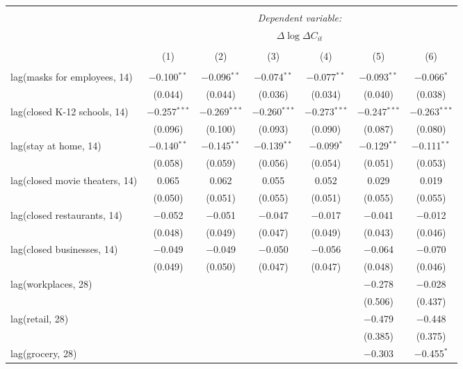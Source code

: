 \begin{tabular}{@{\extracolsep{1pt}}lcccccc} 
\\[-1.8ex]\hline 
\hline \\[-1.8ex] 
 & \multicolumn{6}{c}{\textit{Dependent variable:}} \\ 
\cline{2-7} 
 & \multicolumn{6}{c}{$\Delta \log \Delta C_{it}$} \\ 
\\[-1.8ex] & (1) & (2) & (3) & (4) & (5) & (6)\\ 
\hline \\[-1.8ex] 
 lag(masks for employees, 14) & $-$0.100$^{**}$ & $-$0.096$^{**}$ & $-$0.074$^{**}$ & $-$0.077$^{**}$ & $-$0.093$^{**}$ & $-$0.066$^{*}$ \\ 
  & (0.044) & (0.044) & (0.036) & (0.034) & (0.040) & (0.038) \\ 
  lag(closed K-12 schools, 14) & $-$0.257$^{***}$ & $-$0.269$^{***}$ & $-$0.260$^{***}$ & $-$0.273$^{***}$ & $-$0.247$^{***}$ & $-$0.263$^{***}$ \\ 
  & (0.096) & (0.100) & (0.093) & (0.090) & (0.087) & (0.080) \\ 
  lag(stay at home, 14) & $-$0.140$^{**}$ & $-$0.145$^{**}$ & $-$0.139$^{**}$ & $-$0.099$^{*}$ & $-$0.129$^{**}$ & $-$0.111$^{**}$ \\ 
  & (0.058) & (0.059) & (0.056) & (0.054) & (0.051) & (0.053) \\ 
  lag(closed movie theaters, 14) & 0.065 & 0.062 & 0.055 & 0.052 & 0.029 & 0.019 \\ 
  & (0.050) & (0.051) & (0.055) & (0.051) & (0.055) & (0.055) \\ 
  lag(closed restaurants, 14) & $-$0.052 & $-$0.051 & $-$0.047 & $-$0.017 & $-$0.041 & $-$0.012 \\ 
  & (0.048) & (0.049) & (0.047) & (0.049) & (0.043) & (0.046) \\ 
  lag(closed businesses, 14) & $-$0.049 & $-$0.049 & $-$0.050 & $-$0.056 & $-$0.064 & $-$0.070 \\ 
  & (0.049) & (0.050) & (0.047) & (0.047) & (0.048) & (0.046) \\ 
  lag(workplaces, 28) &  &  &  &  & $-$0.278 & $-$0.028 \\ 
  &  &  &  &  & (0.506) & (0.437) \\ 
  lag(retail, 28) &  &  &  &  & $-$0.479 & $-$0.448 \\ 
  &  &  &  &  & (0.385) & (0.375) \\ 
  lag(grocery, 28) &  &  &  &  & $-$0.303 & $-$0.455$^{*}$ \\ 

\end{tabular}
